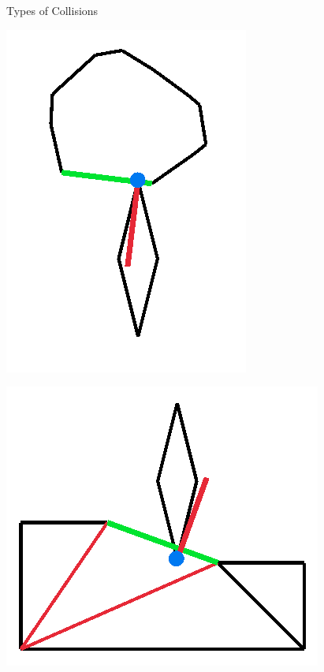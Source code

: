 \begin{frame}{Types of Collisions}
\begin{minipage}{\textwidth}
\begin{minipage}{0.24\textwidth}
            \includegraphics[width=.8\textwidth]{figures/colls/rhw.png}
        \end{minipage}
        \begin{minipage}{0.24\textwidth}
            \centering
            \includegraphics[width=\textwidth]{figures/colls/htw.png}

\end{minipage}
\end{minipage}
\end{frame}
